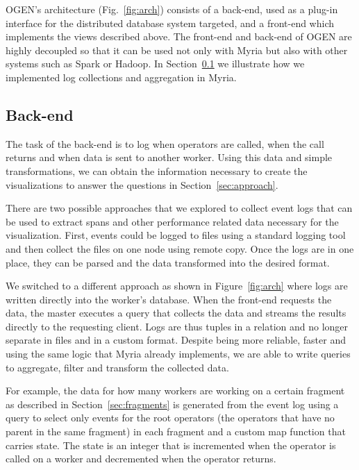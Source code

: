\documentclass{chi2009}
\newcommand*{\system}{OGEN\xspace}
\begin{document}

\system's architecture (Fig.~\ref{fig:arch}) consists of a back-end,
used as a plug-in interface for the distributed database system targeted, and a
front-end which implements the views described above. The front-end and
back-end of \system are highly decoupled so that it can be used not only with
Myria but also with other systems such as Spark or Hadoop. In
Section~\ref{sec:back} we illustrate how we implemented log collections and
aggregation in Myria.

\subsection{Back-end}
\label{sec:back}

The task of the back-end is to log when operators are called, when the call returns and when data is sent to another worker. Using this data and simple transformations, we can obtain the information necessary to create the visualizations to answer the questions in Section~\ref{sec:approach}.

There are two possible approaches that we explored to collect event logs that can be used to extract spans and other performance related data necessary for the visualization. First, events could be logged to files using a standard logging tool and then collect the files on one node using remote copy. Once the logs are in one place, they can be parsed and the data transformed into the desired format.

We switched to a different approach as shown in Figure~\ref{fig:arch} where logs are written directly into the worker's database. When the front-end requests the data, the master executes a query that collects the data and streams the results directly to the requesting client. Logs are thus tuples in a relation and no longer separate in files and in a custom format. Despite being more reliable, faster and using the same logic that Myria already implements, we are able to write queries to aggregate, filter and transform the collected data.

For example, the data for how many workers are working on a certain fragment as described in Section~\ref{sec:fragments} is generated from the event log using a query to select only events for the root operators (the operators that have no parent in the same fragment) in each fragment and a custom map function that carries state. The state is an integer that is incremented when the operator is called on a worker and decremented when the operator returns.
\end{document}
